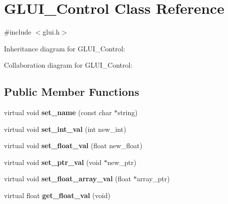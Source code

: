 \hypertarget{class_g_l_u_i___control}{\section{G\+L\+U\+I\+\_\+\+Control Class Reference}
\label{class_g_l_u_i___control}
}


{\ttfamily \#include $<$glui.\+h$>$}



Inheritance diagram for G\+L\+U\+I\+\_\+\+Control\+:


Collaboration diagram for G\+L\+U\+I\+\_\+\+Control\+:
\subsection*{Public Member Functions}
\begin{DoxyCompactItemize}
\item 
\hypertarget{class_g_l_u_i___control_ac3b3516840d5a736e39f1fd55b6d938b}{virtual void {\bfseries set\+\_\+name} (const char $\ast$string)}\label{class_g_l_u_i___control_ac3b3516840d5a736e39f1fd55b6d938b}

\item 
\hypertarget{class_g_l_u_i___control_a32ef6d11d6c62e344f17268dfb96aad6}{virtual void {\bfseries set\+\_\+int\+\_\+val} (int new\+\_\+int)}\label{class_g_l_u_i___control_a32ef6d11d6c62e344f17268dfb96aad6}

\item 
\hypertarget{class_g_l_u_i___control_a231fe69a978a66b858727e50327bcf59}{virtual void {\bfseries set\+\_\+float\+\_\+val} (float new\+\_\+float)}\label{class_g_l_u_i___control_a231fe69a978a66b858727e50327bcf59}

\item 
\hypertarget{class_g_l_u_i___control_a9c732d42b7d5e418e59c307ef2d98d5c}{virtual void {\bfseries set\+\_\+ptr\+\_\+val} (void $\ast$new\+\_\+ptr)}\label{class_g_l_u_i___control_a9c732d42b7d5e418e59c307ef2d98d5c}

\item 
\hypertarget{class_g_l_u_i___control_a823a5fb2b33f0f45e56efdcd90ff35a0}{virtual void {\bfseries set\+\_\+float\+\_\+array\+\_\+val} (float $\ast$array\+\_\+ptr)}\label{class_g_l_u_i___control_a823a5fb2b33f0f45e56efdcd90ff35a0}

\item 
\hypertarget{class_g_l_u_i___control_a5b4f37b463259dfbf228b34b901a07cc}{virtual float {\bfseries get\+\_\+float\+\_\+val} (void)}\label{class_g_l_u_i___control_a5b4f37b463259dfbf228b34b901a07cc}


\end{DoxyCompactItemize}
